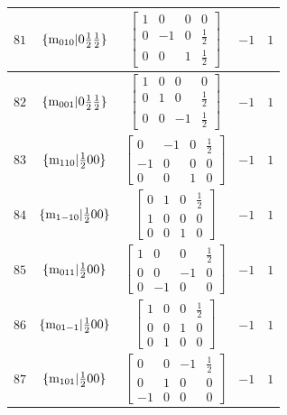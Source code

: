 \documentclass[fleqn,8pt]{jsarticle}
\begin{document}
\begin{longtable}{ccccc}
$ 81 $ & $ \{{\rm m}_{010}|0 \frac{1}{2} \frac{1}{2}\} $ & $ \begin{bmatrix} 1 & 0 & 0 & 0 \\ 0 & -1 & 0 & \frac{1}{2} \\ 0 & 0 & 1 & \frac{1}{2} \end{bmatrix} $ & $ -1 $ & $ 1 $ \\ \hline
$ 82 $ & $ \{{\rm m}_{001}|0 \frac{1}{2} \frac{1}{2}\} $ & $ \begin{bmatrix} 1 & 0 & 0 & 0 \\ 0 & 1 & 0 & \frac{1}{2} \\ 0 & 0 & -1 & \frac{1}{2} \end{bmatrix} $ & $ -1 $ & $ 1 $ \\ \hline
$ 83 $ & $ \{{\rm m}_{110}|\frac{1}{2} 0 0\} $ & $ \begin{bmatrix} 0 & -1 & 0 & \frac{1}{2} \\ -1 & 0 & 0 & 0 \\ 0 & 0 & 1 & 0 \end{bmatrix} $ & $ -1 $ & $ 1 $ \\ \hline
$ 84 $ & $ \{{\rm m}_{1-10}|\frac{1}{2} 0 0\} $ & $ \begin{bmatrix} 0 & 1 & 0 & \frac{1}{2} \\ 1 & 0 & 0 & 0 \\ 0 & 0 & 1 & 0 \end{bmatrix} $ & $ -1 $ & $ 1 $ \\ \hline
$ 85 $ & $ \{{\rm m}_{011}|\frac{1}{2} 0 0\} $ & $ \begin{bmatrix} 1 & 0 & 0 & \frac{1}{2} \\ 0 & 0 & -1 & 0 \\ 0 & -1 & 0 & 0 \end{bmatrix} $ & $ -1 $ & $ 1 $ \\ \hline
$ 86 $ & $ \{{\rm m}_{01-1}|\frac{1}{2} 0 0\} $ & $ \begin{bmatrix} 1 & 0 & 0 & \frac{1}{2} \\ 0 & 0 & 1 & 0 \\ 0 & 1 & 0 & 0 \end{bmatrix} $ & $ -1 $ & $ 1 $ \\ \hline
$ 87 $ & $ \{{\rm m}_{101}|\frac{1}{2} 0 0\} $ & $ \begin{bmatrix} 0 & 0 & -1 & \frac{1}{2} \\ 0 & 1 & 0 & 0 \\ -1 & 0 & 0 & 0 \end{bmatrix} $ & $ -1 $ & $ 1 $ \\ \hline

\end{longtable}
\end{document}
